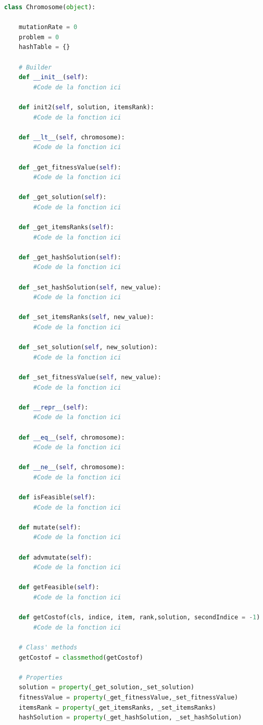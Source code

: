 \documentclass[12pt,a4paper]{article}
\begin{document}
	\begin{lstlisting}[language=python]
class Chromosome(object):

	mutationRate = 0
	problem = 0
	hashTable = {}

	# Builder 
	def __init__(self):
		#Code de la fonction ici
	
	def init2(self, solution, itemsRank):
		#Code de la fonction ici
	
	def __lt__(self, chromosome):
		#Code de la fonction ici
	
	def _get_fitnessValue(self):
		#Code de la fonction ici
	
	def _get_solution(self):
		#Code de la fonction ici
	
	def _get_itemsRanks(self):
		#Code de la fonction ici
	
	def _get_hashSolution(self):
		#Code de la fonction ici
	
	def _set_hashSolution(self, new_value):
		#Code de la fonction ici
	
	def _set_itemsRanks(self, new_value):
		#Code de la fonction ici
	
	def _set_solution(self, new_solution):
		#Code de la fonction ici
	
	def _set_fitnessValue(self, new_value):
		#Code de la fonction ici
	
	def __repr__(self):
		#Code de la fonction ici
	
	def __eq__(self, chromosome):
		#Code de la fonction ici
	
	def __ne__(self, chromosome):
		#Code de la fonction ici
	
	def isFeasible(self):
		#Code de la fonction ici
	
	def mutate(self):
		#Code de la fonction ici
	
	def advmutate(self):
		#Code de la fonction ici
	
	def getFeasible(self):
		#Code de la fonction ici
	
	def getCostof(cls, indice, item, rank,solution, secondIndice = -1):
		#Code de la fonction ici
	
	# Class' methods
	getCostof = classmethod(getCostof)

	# Properties
	solution = property(_get_solution,_set_solution)
	fitnessValue = property(_get_fitnessValue,_set_fitnessValue)
	itemsRank = property(_get_itemsRanks, _set_itemsRanks)
	hashSolution = property(_get_hashSolution, _set_hashSolution) 

    \end{lstlisting}
    
\end{document}

